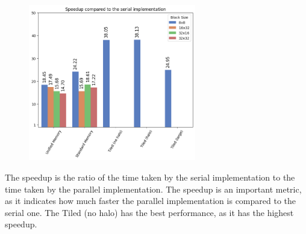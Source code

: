 \documentclass{article}
\begin{document}
\begin{figure}[H]
    \centering
    \includegraphics[width=0.65\textwidth]{./pics/speedup.png}
    \label{fig:speedups}
\end{figure}
The speedup is the ratio of the time taken by the serial implementation to the time taken by the parallel implementation. The speedup is an important metric, as it indicates how much faster the parallel implementation is compared to the serial one. The Tiled (no halo) has the best performance, as it has the highest speedup.
\newpage
\end{document}
